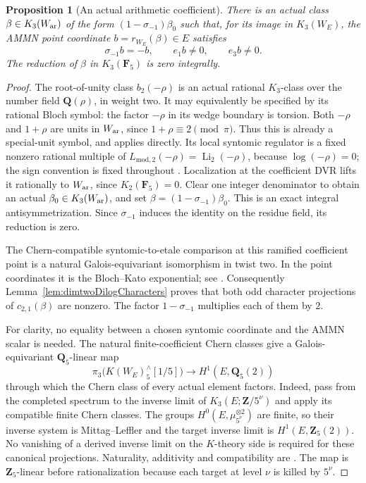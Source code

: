 \documentclass[11pt,a4paper]{article}
\newtheorem{proposition}[theorem]{Proposition}
\theoremstyle{remark}
\begin{document}
\begin{proposition}[An actual arithmetic coefficient]
\label{prop:dimtwoActualCoefficient}
There is an actual class
$\beta\in K_3(W_{\rm ar})$ of the form
$(1-\sigma_{-1})\beta_0$ such that, for its image in $K_3(W_E)$,
the AMMN point coordinate $b=r_{W_E}(\beta)\in E$ satisfies
\[
 \sigma_{-1}b=-b,\qquad e_1b\ne0,\qquad e_3b\ne0.
\]
The reduction of $\beta$ in $K_3(\mathbf F_5)$ is zero integrally.
\end{proposition}

\begin{proof}
The root-of-unity class $b_2(-\rho)$ is an actual rational
$K_3$-class over the number field $\mathbf Q(\rho)$, in weight two.
It may equivalently be specified by its rational Bloch symbol:
the factor $-\rho$ in its wedge boundary is torsion.
Both $-\rho$ and $1+\rho$ are units in $W_{\rm ar}$, since
$1+\rho\equiv2\pmod\pi$.  Thus this is already a special-unit
symbol, and \cite[Theorem~1.10(2)]{BesserDeJeu} applies directly.
Its local syntomic regulator is a fixed nonzero rational multiple
of $L_{\mathrm{mod},2}(-\rho)=\operatorname{Li}_2(-\rho)$,
because $\log(-\rho)=0$; the sign convention is fixed throughout
\cite[Remark~1.7]{BesserDeJeu}.  Localization at the coefficient
DVR lifts it rationally to $W_{\rm ar}$, since
$K_2(\mathbf F_5)=0$.  Clear one integer denominator to obtain
an actual $\beta_0\in K_3(W_{\rm ar})$, and set
$\beta=(1-\sigma_{-1})\beta_0$.
This is an exact integral antisymmetrization.  Since $\sigma_{-1}$
induces the identity on the residue field, its reduction is zero.

The Chern-compatible syntomic-to-etale comparison at this
ramified coefficient point is a natural Galois-equivariant
isomorphism in twist two.  In the point coordinates it is the
Bloch--Kato exponential; see
\cite[Example~2.2.4 and Propositions~2.2.7, 2.2.9, 2.3.4]{HuberKings}.
Consequently
Lemma~\ref{lem:dimtwoDilogCharacters} proves that both odd
character projections of $c_{2,1}(\beta)$ are nonzero.  The
factor $1-\sigma_{-1}$ multiplies each of them by $2$.

For clarity, no equality between a chosen syntomic coordinate
and the AMMN scalar is needed.  The natural finite-coefficient
Chern classes give a Galois-equivariant $\mathbf Q_5$-linear map
\[
 \pi_3\bigl(K(W_E)^\wedge_5[1/5]\bigr)
       \longrightarrow H^1(E,\mathbf Q_5(2))
\]
through which the Chern class of every actual element factors.
Indeed, pass from the completed spectrum to the inverse limit of
$K_3(E;\mathbf Z/5^\nu)$ and apply its compatible finite Chern
classes.  The groups $H^0(E,\mu_{5^\nu}^{\otimes2})$ are finite,
so their inverse system is Mittag--Leffler and the target inverse
limit is $H^1(E,\mathbf Z_5(2))$.  No vanishing of a derived
inverse limit on the $K$-theory side is required for these
canonical projections.  Naturality, additivity and compatibility
are \cite[Proposition~2.1.1, Lemma~2.3 and Propositions~2.4, 2.8]{WeibelChern}.
The map is $\mathbf Z_5$-linear before rationalization because
each target at level $\nu$ is killed by $5^\nu$.


\end{proof}
\end{document}
